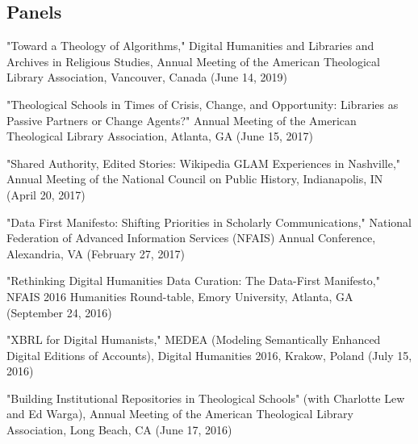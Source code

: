 \documentclass[10pt]{res} %
\begin{document}
\begin{resume}
\section{Panels}

\begin{hangparas}{.25in}{1}"Toward a Theology of Algorithms," Digital Humanities and Libraries and Archives in Religious Studies, Annual Meeting of the American Theological Library Association, Vancouver, Canada (June 14, 2019)\end{hangparas}

\begin{hangparas}{.25in}{1}"Theological Schools in Times of Crisis, Change, and Opportunity: Libraries as Passive Partners or Change Agents?" Annual Meeting of the American Theological Library Association, Atlanta, GA (June 15, 2017)\end{hangparas}

\begin{hangparas}{.25in}{1}"Shared Authority, Edited Stories: Wikipedia GLAM Experiences in Nashville," Annual Meeting of the National Council on Public History, Indianapolis, IN (April 20, 2017)\end{hangparas}

\begin{hangparas}{.25in}{1}"Data First Manifesto: Shifting Priorities in Scholarly Communications," National Federation of Advanced Information Services (NFAIS) Annual Conference, Alexandria, VA (February 27, 2017)\end{hangparas}

\begin{hangparas}{.25in}{1}"Rethinking Digital Humanities Data Curation: The Data-First Manifesto," NFAIS 2016 Humanities Round-table, Emory University, Atlanta, GA (September 24, 2016)\end{hangparas}

\begin{hangparas}{.25in}{1}"XBRL for Digital Humanists," MEDEA (Modeling Semantically Enhanced Digital Editions of Accounts), Digital Humanities 2016, Krakow, Poland (July 15, 2016)\end{hangparas}

\begin{hangparas}{.25in}{1}"Building Institutional Repositories in Theological Schools" (with Charlotte Lew and Ed Warga), Annual Meeting of the American Theological Library Association, Long Beach, CA (June 17, 2016)\end{hangparas}


\end{resume}
\end{document}
